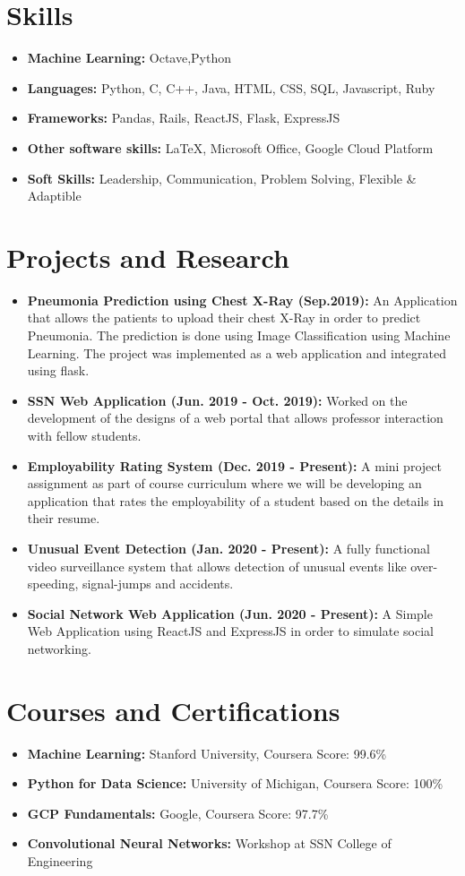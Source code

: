 \documentclass[letterpaper,12pt]{article}
\newcommand{\resumeItem}[2]{
\item\small{
\textbf{#1}{ #2 \vspace{-2pt}}
}
}
\newcommand{\resumeSubHeadingListStart}{\begin{itemize}[leftmargin=*]}
\newcommand{\resumeSubHeadingListEnd}{\end{itemize}}
\begin{document}
\section{Skills}
\resumeSubHeadingListStart
\resumeItem{Machine Learning:}{Octave,Python}
\resumeItem{Languages:}{Python, C, C++, Java, HTML, CSS, SQL, Javascript, Ruby}
\resumeItem{Frameworks:}{Pandas, Rails, ReactJS, Flask, ExpressJS}
\resumeItem{Other software skills:}{LaTeX, Microsoft Office, Google Cloud Platform}
\resumeItem{Soft Skills:}{Leadership, Communication, Problem Solving, Flexible \& Adaptible} 
\resumeSubHeadingListEnd



\section{Projects and Research}
\resumeSubHeadingListStart
\resumeItem{Pneumonia Prediction using Chest X-Ray (Sep.2019):}{An Application that allows the patients to upload their chest X-Ray in order to predict Pneumonia. The prediction is done using Image Classification using Machine Learning. The project was implemented as a web application and integrated using flask. }
\resumeItem{SSN Web Application (Jun. 2019 - Oct. 2019):}{Worked on the development of the designs of a web portal that allows professor interaction with fellow students.}
\resumeItem{Employability Rating System (Dec. 2019 - Present):}{A mini project assignment as part of course curriculum where we will be developing an application that rates the employability of a student based on the details in their resume.}
\resumeItem{Unusual Event Detection (Jan. 2020 - Present):}{ A fully functional video surveillance system that allows detection of unusual events like over-speeding, signal-jumps and accidents.
}
\resumeItem{Social Network Web Application (Jun. 2020 - Present):}{ A Simple Web Application using ReactJS and ExpressJS in order to simulate social networking.
}
\resumeSubHeadingListEnd


\section{Courses and Certifications}
\resumeSubHeadingListStart
\resumeItem{Machine Learning:}{Stanford University, Coursera}{Score: 99.6\%}
\resumeItem{Python for Data Science:}{University of Michigan, Coursera}{Score: 100\%}
\resumeItem{GCP Fundamentals:}{Google, Coursera}{Score: 97.7\%}
\resumeItem{Convolutional Neural Networks:}{Workshop at SSN College of Engineering}
\resumeSubHeadingListEnd
\end{document}
